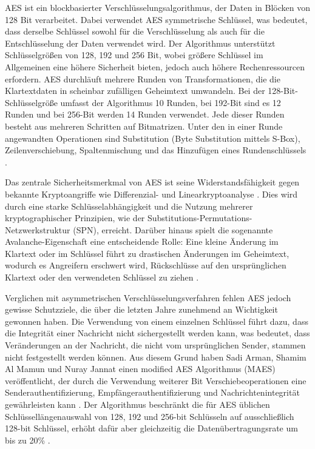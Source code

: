 \documentclass[
	fontsize=11pt,
	headings=small,
	parskip=half,           %
	bibliography=totoc,
	numbers=noenddot,       %
	open=any,               %
]{scrreprt}
\begin{document}
AES ist ein blockbasierter Verschlüsselungsalgorithmus, der Daten in Blöcken von 128 Bit verarbeitet. Dabei verwendet AES symmetrische Schlüssel, was bedeutet, dass derselbe Schlüssel sowohl für die Verschlüsselung als auch für die Entschlüsselung der Daten verwendet wird. Der Algorithmus unterstützt Schlüsselgrößen von 128, 192 und 256 Bit, wobei größere Schlüssel im Allgemeinen eine höhere Sicherheit bieten, jedoch auch höhere Rechenressourcen erfordern. AES durchläuft mehrere Runden von Transformationen, die die Klartextdaten in scheinbar zufälligen Geheimtext umwandeln. Bei der 128-Bit-Schlüsselgröße umfasst der Algorithmus 10 Runden, bei 192-Bit sind es 12 Runden und bei 256-Bit werden 14 Runden verwendet. Jede dieser Runden besteht aus mehreren Schritten auf Bitmatrizen. Unter den in einer Runde angewandten Operationen sind Substitution (Byte Substitution mittels S-Box), Zeilenverschiebung, Spaltenmischung und das Hinzufügen eines Rundenschlüssels \cite{aes-abdullah2017advanced}.

Das zentrale Sicherheitsmerkmal von AES ist seine Widerstandsfähigkeit gegen bekannte Kryptoangriffe wie Differenzial- und Linearkryptoanalyse \cite{aes-de2019linear,aes-hameed2018review}. Dies wird durch eine starke Schlüsselabhängigkeit und die Nutzung mehrerer kryptographischer Prinzipien, wie der Substitutions-Permutations-Netzwerkstruktur (SPN), erreicht. Darüber hinaus spielt die sogenannte Avalanche-Eigenschaft eine entscheidende Rolle: Eine kleine Änderung im Klartext oder im Schlüssel führt zu drastischen Änderungen im Geheimtext, wodurch es Angreifern erschwert wird, Rückschlüsse auf den ursprünglichen Klartext oder den verwendeten Schlüssel zu ziehen \cite{aes-bhoge2014avalanche}.

Verglichen mit asymmetrischen Verschlüsselungsverfahren fehlen AES jedoch gewisse Schutzziele, die über die letzten Jahre zunehmend an Wichtigkeit gewonnen haben. Die Verwendung von einem einzelnen Schlüssel führt dazu, dass die Integrität einer Nachricht nicht sichergestellt werden kann, was bedeutet, dass Veränderungen an der Nachricht, die nicht vom ursprünglichen Sender, stammen nicht festgestellt werden können. Aus diesem Grund haben Sadi Arman, Shamim Al Mamun und Nuray Jannat einen modified AES Algorithmus (MAES) veröffentlicht, der durch die Verwendung weiterer Bit Verschiebeoperationen eine Senderauthentifizierung, Empfängerauthentifizierung und Nachrichtenintegrität gewährleisten kann \cite{aes-arman2024modified}. Der Algorithmus beschränkt die für AES üblichen Schlüssellängenauswahl von 128, 192 und 256-bit Schlüsseln auf ausschließlich 128-bit Schlüssel, erhöht dafür aber gleichzeitig die Datenübertragungsrate um bis zu 20\% \cite{aes-arman2024modified}.
\end{document}

